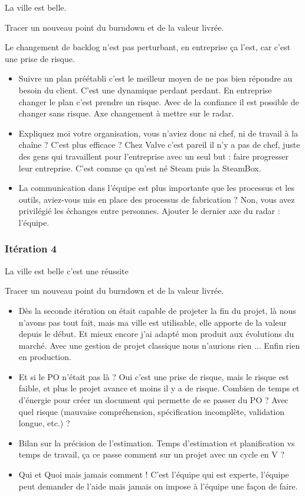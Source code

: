\documentclass[a4paper,12pt]{article}
\begin{document}
La ville est belle.

Tracer un nouveau point du burndown et de la valeur livrée.

Le changement de backlog n'est pas perturbant, en entreprise ça l'est, car c'est une prise de risque.

\begin{itemize}
  \item Suivre un plan préétabli c'est le meilleur moyen de ne pas bien répondre au besoin du client. C'est une dynamique perdant perdant. En entreprise changer le plan c'est prendre un risque. Avec de la confiance il est possible de changer sans risque. Axe changement à mettre sur le radar.
  \item Expliquez moi votre organisation, vous n'aviez donc ni chef, ni de travail à la chaîne ? C'est plus efficace ? Chez Valve c'est pareil il n'y a pas de chef, juste des gens qui travaillent pour l'entreprise avec un seul but : faire progresser leur entreprise. C'est comme ça qu'est né Steam puis la SteamBox.
  \item La communication dans l'équipe est plus importante que les processus et les outils, aviez-vous mis en place des processus de fabrication ? Non, vous avez privilégié les échanges entre personnes. Ajouter le dernier axe du radar : l'équipe.
\end{itemize}

\subsubsection{Itération 4}
La ville est belle c'est une réussite

Tracer un nouveau point du burndown et de la valeur livrée.

\begin{itemize}
  \item Dès la seconde itération on était capable de projeter la fin du projet, là nous n'avons pas tout fait, mais ma ville est utilisable, elle apporte de la valeur depuis le début. Et mieux encore j'ai adapté mon produit aux évolutions du marché. Avec une gestion de projet classique nous n'aurions rien ... Enfin rien en production.
  \item Et si le PO n'était pas là ? Oui c'est une prise de risque, mais le risque est faible, et plus le projet avance et moins il y a de risque. Combien de temps et d'énergie pour créer un document qui permette de se passer du PO ? Avec quel risque (mauvaise compréhension, spécification incomplète, validation longue, etc.) ?
  \item Bilan sur la précision de l'estimation. Temps d'estimation et planification vs temps de travail, ça ce passe comment sur un projet avec un cycle en V ?
  \item Qui et Quoi mais jamais comment ! C'est l'équipe qui est experte, l'équipe peut demander de l'aide mais jamais on impose à l'équipe une façon de faire.
\end{itemize}
\end{document}
